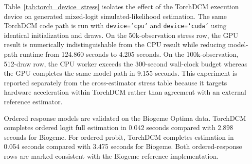 

Table~\ref{tab:torch_device_stress} isolates the effect of the TorchDCM execution device on generated mixed-logit simulated-likelihood estimation.
The same TorchDCM code path is run with \texttt{device='cpu'} and \texttt{device='cuda'} using identical initialization and draws.
On the 50k-observation stress row, the GPU result is numerically indistinguishable from the CPU result while reducing model-path runtime from 124.860 seconds to 4.205 seconds.
On the 100k-observation, 512-draw row, the CPU worker exceeds the 300-second wall-clock budget whereas the GPU completes the same model path in 9.155 seconds.
This experiment is reported separately from the cross-estimator stress table because it targets hardware acceleration within TorchDCM rather than agreement with an external reference estimator.

Ordered response models are validated on the Biogeme Optima data.
TorchDCM completes ordered logit full estimation in 0.042 seconds compared with 2.898 seconds for Biogeme.
For ordered probit, TorchDCM completes estimation in 0.054 seconds compared with 3.475 seconds for Biogeme.
Both ordered-response rows are marked consistent with the Biogeme reference implementation.
